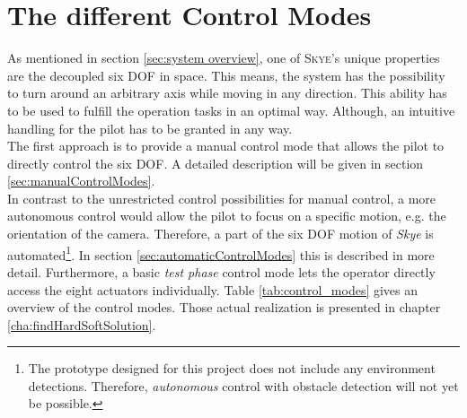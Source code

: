 \graphicspath{{graphics/HMI/}{graphics/control_modes/}}
\chapter{The different Control Modes}
\label{cha:DifferentControlModes}


As mentioned in section \ref{sec:system overview}, one of \textsc{Skye}'s unique properties are the decoupled six DOF in space. This means, the system has the possibility to turn around an arbitrary axis while moving in any direction. This ability has to be used to fulfill the operation tasks in an optimal way. 
Although, an intuitive handling for the pilot has to be granted in any way. \\ 
The first approach is to provide a manual control mode that allows the pilot to directly control the six DOF. A detailed description will be given in section \ref{sec:manualControlModes}. \\ 
In contrast to the unrestricted control possibilities for manual control, a more autonomous control would allow the pilot to focus on a specific motion, e.g. the orientation of the camera. Therefore, a part of the six DOF motion of \textit{Skye} is automated\footnote{The prototype designed for this project does not include any environment detections. Therefore, \textit{autonomous} control with obstacle detection will not yet be possible.}. In section \ref{sec:automaticControlModes} this is described in more detail. Furthermore, a basic \textit{test phase} control mode lets the operator directly access the eight actuators individually. Table \ref{tab:control_modes} gives an overview of the control modes. Those actual realization is presented in chapter \ref{cha:findHardSoftSolution}.

